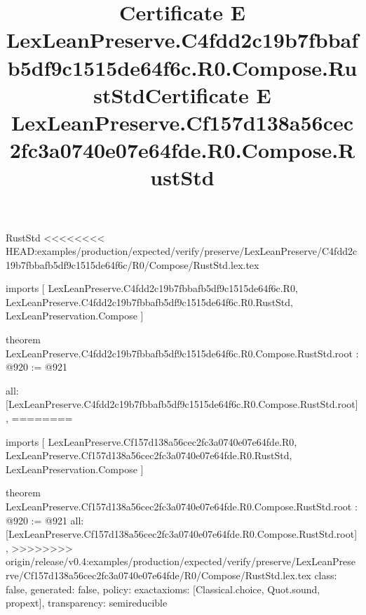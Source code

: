 \begin{lexlean}{RustStd}
<<<<<<<< HEAD:examples/production/expected/verify/preserve/LexLeanPreserve/C4fdd2c19b7fbbafb5df9c1515de64f6c/R0/Compose/RustStd.lex.tex
\title{Certificate E LexLeanPreserve.C4fdd2c19b7fbbafb5df9c1515de64f6c.R0.Compose.RustStd}
\begin{coremodule}
imports [
  LexLeanPreserve.C4fdd2c19b7fbbafb5df9c1515de64f6c.R0,
  LexLeanPreserve.C4fdd2c19b7fbbafb5df9c1515de64f6c.R0.RustStd,
  LexLeanPreservation.Compose
]

theorem LexLeanPreserve.C4fdd2c19b7fbbafb5df9c1515de64f6c.R0.Compose.RustStd.root : @920 := @921 {
  all: [LexLeanPreserve.C4fdd2c19b7fbbafb5df9c1515de64f6c.R0.Compose.RustStd.root],
========
\title{Certificate E LexLeanPreserve.Cf157d138a56cec2fc3a0740e07e64fde.R0.Compose.RustStd}
\begin{coremodule}
imports [
  LexLeanPreserve.Cf157d138a56cec2fc3a0740e07e64fde.R0,
  LexLeanPreserve.Cf157d138a56cec2fc3a0740e07e64fde.R0.RustStd,
  LexLeanPreservation.Compose
]

theorem LexLeanPreserve.Cf157d138a56cec2fc3a0740e07e64fde.R0.Compose.RustStd.root : @920 := @921 {
  all: [LexLeanPreserve.Cf157d138a56cec2fc3a0740e07e64fde.R0.Compose.RustStd.root],
>>>>>>>> origin/release/v0.4:examples/production/expected/verify/preserve/LexLeanPreserve/Cf157d138a56cec2fc3a0740e07e64fde/R0/Compose/RustStd.lex.tex
  class: false,
  generated: false,
  policy: exact{axioms: [Classical.choice, Quot.sound, propext]},
  transparency: semireducible
}


\end{coremodule}}
\end{coremodule}
\end{lexlean}
